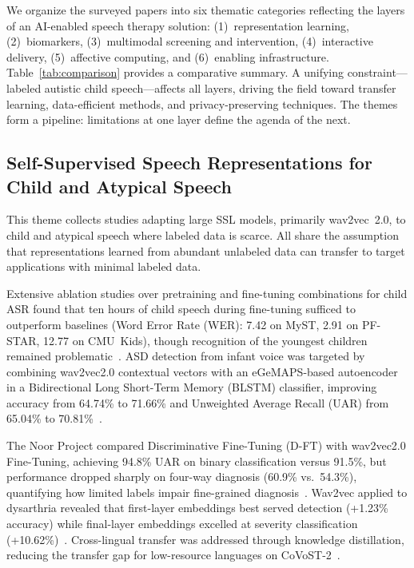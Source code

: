 \documentclass[conference]{IEEEtran}
\begin{document}
We organize the surveyed papers into six thematic categories reflecting the layers of an AI-enabled speech therapy solution: (1)~representation learning, (2)~biomarkers, (3)~multimodal screening and intervention, (4)~interactive delivery, (5)~affective computing, and (6)~enabling infrastructure. Table~\ref{tab:comparison} provides a comparative summary. A unifying constraint---labeled autistic child speech---affects all layers, driving the field toward transfer learning, data-efficient methods, and privacy-preserving techniques. The themes form a pipeline: limitations at one layer define the agenda of the next.

\subsection{Self-Supervised Speech Representations for Child and Atypical Speech}

This theme collects studies adapting large SSL models, primarily wav2vec~2.0, to child and atypical speech where labeled data is scarce. All share the assumption that representations learned from abundant unlabeled data can transfer to target applications with minimal labeled data.

Extensive ablation studies over pretraining and fine-tuning combinations for child ASR found that ten hours of child speech during fine-tuning sufficed to outperform baselines (Word Error Rate (WER): 7.42 on MyST, 2.91 on PF-STAR, 12.77 on CMU~Kids), though recognition of the youngest children remained problematic~\cite{ref1}. ASD detection from infant voice was targeted by combining wav2vec2.0 contextual vectors with an eGeMAPS-based autoencoder in a Bidirectional Long Short-Term Memory (BLSTM) classifier, improving accuracy from 64.74\% to 71.66\% and Unweighted Average Recall (UAR) from 65.04\% to 70.81\%~\cite{ref2}.

The Noor Project compared Discriminative Fine-Tuning (D-FT) with wav2vec2.0 Fine-Tuning, achieving 94.8\% UAR on binary classification versus 91.5\%, but performance dropped sharply on four-way diagnosis (60.9\% vs.\ 54.3\%), quantifying how limited labels impair fine-grained diagnosis~\cite{ref3}. Wav2vec applied to dysarthria revealed that first-layer embeddings best served detection (+1.23\% accuracy) while final-layer embeddings excelled at severity classification (+10.62\%)~\cite{ref4}. Cross-lingual transfer was addressed through knowledge distillation, reducing the transfer gap for low-resource languages on CoVoST-2~\cite{ref5}.
\end{document}
